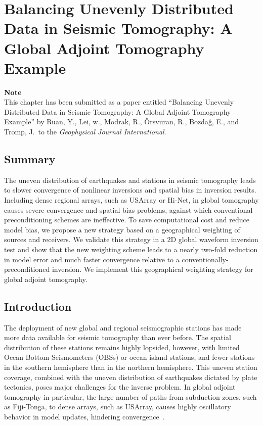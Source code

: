 \chapter{Balancing Unevenly Distributed Data in Seismic Tomography: {A} Global Adjoint Tomography Example\label{ch:weighting}}

\textbf{Note}\\
This chapter has been submitted as a paper entitled ``Balancing Unevenly Distributed Data in Seismic Tomography: {A} Global Adjoint Tomography Example'' by Ruan, Y., Lei, w., Modrak, R., \"{O}rsvuran, R., Bozda\u{g}, E., and Tromp, J.\ to the \textit{Geophysical Journal International}.


\section*{Summary}
The uneven distribution of earthquakes and stations in seismic tomography leads to slower convergence of nonlinear inversions and spatial bias in inversion results.
Including dense regional arrays, such as USArray or Hi-Net, in global tomography causes severe convergence and spatial bias problems, against which conventional preconditioning  schemes are ineffective.
To save computational cost and reduce model bias, we propose a new strategy based on a geographical weighting of sources and receivers.
We validate this strategy in
a 2D global waveform inversion test and show that the new weighting scheme leads to a nearly two-fold reduction in model error and much faster convergence relative to a conventionally-preconditioned inversion.
We implement this geographical weighting strategy for global adjoint tomography.

%
%
\section{Introduction}

The deployment of new global and regional seismographic stations has made  more data available for seismic tomography than ever before.
The spatial distribution of these stations remains highly lopsided, however, with limited Ocean Bottom Seismometers (OBSs) or ocean island stations,
and fewer stations in the southern hemisphere than in the northern hemisphere. 
This uneven station coverage, combined with the uneven distribution of earthquakes dictated by plate tectonics, poses major challenges for the inverse problem.   In global adjoint tomography in particular, the large number of paths from subduction zones, such as Fiji-Tonga, to dense arrays,  such as USArray,  causes highly oscillatory behavior in model updates, hindering convergence~\cite{bozdaug2016global}. 

